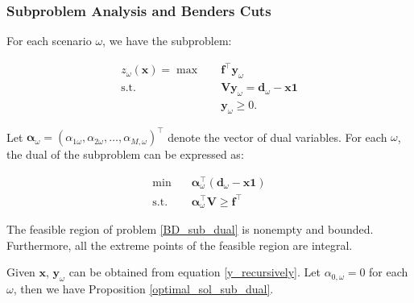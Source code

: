 
\subsubsection{Subproblem Analysis and Benders Cuts}\label{second_stage}
For each scenario $\omega$, we have the subproblem:

\begin{equation}\label{BD_sub}
  \begin{aligned}
    z_{\omega}(\mathbf{x}) = \max \quad & \mathbf{f}^{\intercal} \mathbf{y}_{\omega} \\
    \text {s.t.} \quad & \mathbf{V} \mathbf{y}_{\omega} = \mathbf{d}_{\omega} - \mathbf{x} \mathbf{1} \\
     & \mathbf{y}_{\omega} \geq 0.
  \end{aligned}
\end{equation}


Let $\bm{\alpha}_{\omega} = (\alpha_{1\omega},\alpha_{2\omega}, \ldots, \alpha_{M,\omega})^{\intercal}$ denote the vector of dual variables. For each $\omega$, the dual of the subproblem can be expressed as:

\begin{equation}\label{BD_sub_dual}
  \begin{aligned}
    \min \quad & \bm{\alpha}_{\omega}^{\intercal} (\mathbf{d}_{\omega}- \mathbf{x} \mathbf{1}) \\
    \text {s.t.} \quad & \bm{\alpha}_{\omega}^{\intercal} \mathbf{V} \geq \mathbf{f}^{\intercal}
  \end{aligned}
\end{equation}

\begin{lem}\label{feasible_region}
 The feasible region of problem \eqref{BD_sub_dual} is nonempty and bounded. Furthermore, all the extreme points of the feasible region are integral.
\end{lem}


Given $\mathbf{x}$, $\mathbf{y}_{\omega}$ can be obtained from equation \eqref{y_recursively}. Let $\alpha_{0, \omega} = 0$ for each $\omega$, then we have Proposition \ref{optimal_sol_sub_dual}.

